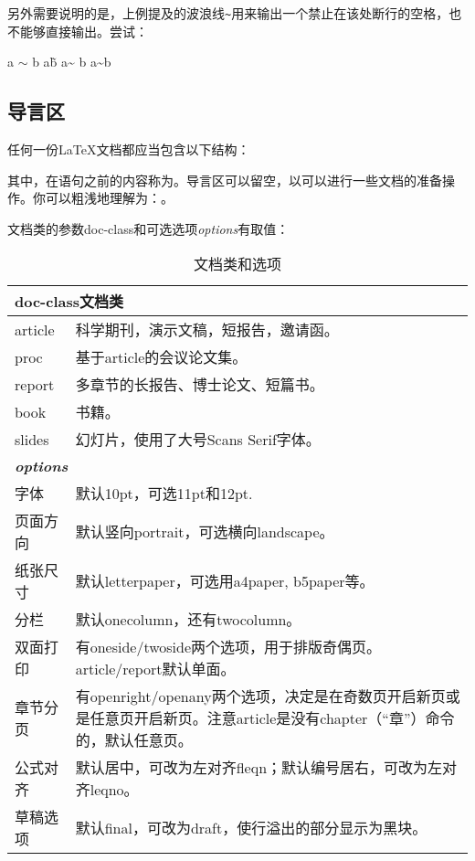 另外需要说明的是，上例提及的波浪线{\texttt{\~}}用来输出一个禁止在该处断行的空格，也不能够直接输出。尝试：
\begin{codeshow}
a $\sim$ b
a\~ b
a\~{} b
a\textasciitilde b
\end{codeshow}

\subsection{导言区}
任何一份\LaTeX{}文档都应当包含以下结构：

其中，在语句之前的内容称为。导言区可以留空，以可以进行一些文档的准备操作。你可以粗浅地理解为：。\dpar

文档类的参数doc-class和可选选项{\textit{options}}有取值：
\begin{table}[!htb]
    \centering
	\caption{文档类和选项}
	\label{tab:documentclass}
	\begin{tabular}{p{5em} @{\ -\ } p{24em}}
		\hline
		 \\
		\hline
		article   & 科学期刊，演示文稿，短报告，邀请函。\\
		proc      & 基于article的会议论文集。\\
		report    & 多章节的长报告、博士论文、短篇书。\\
		book      & 书籍。\\
		slides    & 幻灯片，使用了大号Scans Serif字体。\\
		\hline
		 \\
		\hline
		字体     & 默认10pt，可选11pt和12pt.\\
		页面方向 & 默认竖向portrait，可选横向landscape。\\
		纸张尺寸 & 默认letterpaper，可选用a4paper, b5paper等。\\
		分栏     & 默认onecolumn，还有twocolumn。\\
		双面打印 & 有oneside/twoside两个选项，用于排版奇偶页。article/report默认单面。\\
		章节分页 & 有openright/openany两个选项，决定是在奇数页开启新页或是任意页开启新页。注意article是没有chapter（``章''）命令的，默认任意页。\\
		公式对齐 & 默认居中，可改为左对齐fleqn；默认编号居右，可改为左对齐leqno。\\
		草稿选项 & 默认final，可改为draft，使行溢出的部分显示为黑块。\\
		\hline
	\end{tabular}
\end{table}


